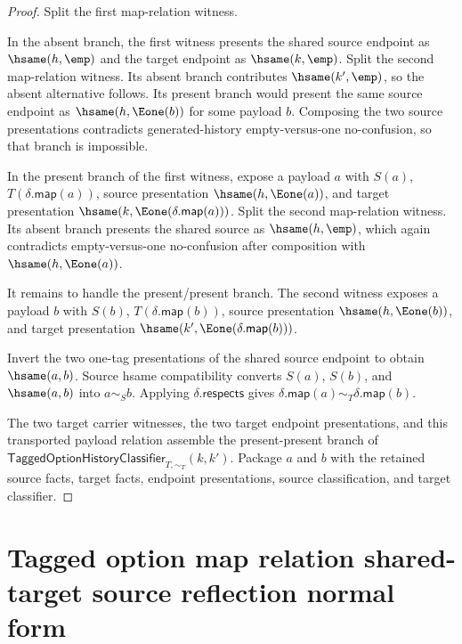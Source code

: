 \begin{proof}
Split the first map-relation witness.

In the absent branch, the first witness presents the shared source endpoint as
$\hsame(h,\emp)$ and the target endpoint as $\hsame(k,\emp)$. Split the second
map-relation witness. Its absent branch contributes $\hsame(k',\emp)$, so the
absent alternative follows. Its present branch would present the same source
endpoint as $\hsame(h,\Eone(b))$ for some payload $b$. Composing the two source
presentations contradicts generated-history empty-versus-one no-confusion, so
that branch is impossible.

In the present branch of the first witness, expose a payload $a$ with $S(a)$,
$T(\delta.\mathsf{map}(a))$, source presentation $\hsame(h,\Eone(a))$, and
target presentation $\hsame(k,\Eone(\delta.\mathsf{map}(a)))$. Split the
second map-relation witness. Its absent branch presents the shared source as
$\hsame(h,\emp)$, which again contradicts empty-versus-one no-confusion after
composition with $\hsame(h,\Eone(a))$.

It remains to handle the present/present branch. The second witness exposes a
payload $b$ with $S(b)$, $T(\delta.\mathsf{map}(b))$, source presentation
$\hsame(h,\Eone(b))$, and target presentation
$\hsame(k',\Eone(\delta.\mathsf{map}(b)))$.

Invert the two one-tag presentations of the shared source endpoint to obtain
$\hsame(a,b)$. Source hsame compatibility converts $S(a)$, $S(b)$, and
$\hsame(a,b)$ into $a\sim_S b$. Applying $\delta.\mathsf{respects}$ gives
$\delta.\mathsf{map}(a)\sim_T\delta.\mathsf{map}(b)$.

The two target carrier witnesses, the two target endpoint presentations, and
this transported payload relation assemble the present-present branch of
$\mathsf{TaggedOptionHistoryClassifier}_{T,\sim_T}(k,k')$. Package $a$ and $b$
with the retained source facts, target facts, endpoint presentations, source
classification, and target classifier.
\end{proof}

\section{Tagged option map relation shared-target source reflection normal form}
\label{sec:option-maprel-shared-target-source-reflection-normal-form}


